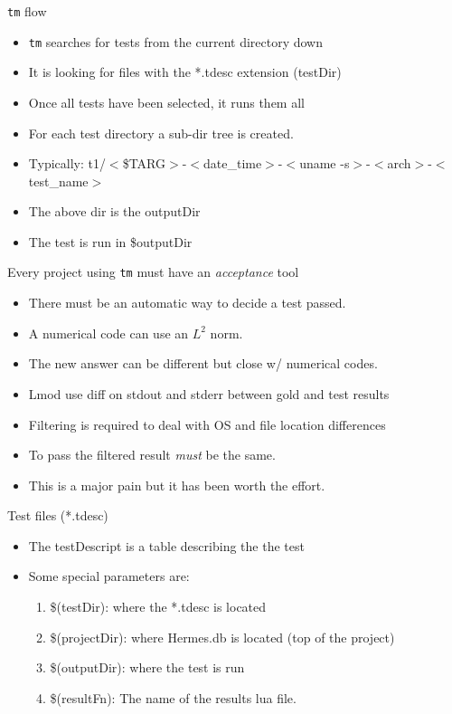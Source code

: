 \documentclass{beamer}
\begin{document}
\begin{frame}{\texttt{tm} flow}
  \begin{itemize}
    \item \texttt{tm} searches for tests from the current directory
      down
    \item It is looking for files with the *.tdesc extension (testDir)
    \item Once all tests have been selected, it runs them all
    \item For each test directory a sub-dir tree is created.
    \item Typically: t1/$<$\$TARG$>$-$<$date\_time$>$-$<$uname
      -s$>$-$<$arch$>$-$<$test\_name$>$
    \item The above dir is the outputDir
    \item The test is run in \$outputDir
  \end{itemize}
\end{frame}

\begin{frame}{Every project using \texttt{tm} must have an \emph{acceptance} tool}
  \begin{itemize}
    \item There must be an automatic way to decide a test passed.
    \item A numerical code can use an $L^2$ norm. 
    \item The new answer can be different but close w/ numerical codes.
    \item Lmod use diff on stdout and stderr between gold and test
      results
    \item Filtering is required to deal with OS and file location
      differences
    \item To pass the filtered result {\color{blue} \emph{must}} be
      the same.
    \item This is a major pain but it has been worth the effort.
  \end{itemize}
\end{frame}

\begin{frame}{Test files (*.tdesc)}
  \begin{itemize}
    \item The testDescript is a table describing the the test
    \item Some special parameters are:
      \begin{enumerate}
        \item \$(testDir): where the *.tdesc is located
        \item \$(projectDir): where Hermes.db is located (top of the
          project)
        \item \$(outputDir): where the test is run
        \item \$(resultFn): The name of the results lua file.
      \end{enumerate}
  \end{itemize}
\end{frame}
\end{document}
